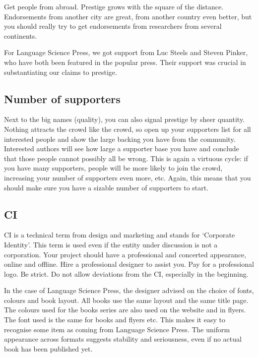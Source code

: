 \documentclass[guidelines,nonflat,modfonts] {langsci/langscibook}
\begin{document}
Get people from abroad. Prestige grows with the square of the distance. Endorsements from another city are great, from another country even better, but you should really try to get endorsements from researchers from several continents. 

For Language Science Press, we got support from Luc Steels and Steven Pinker, who have both been featured in the popular press. Their support was crucial in substantiating our claims to prestige. 

\subsection{Number of supporters}
Next to the big names (quality), you can also signal prestige by sheer quantity. Nothing attracts the crowd like the crowd, so open up your supporters list for all interested people and show the large backing you have from the community. Interested authors will see how large a supporter base you have and conclude that those people cannot possibly all be wrong. This is again a virtuous cycle: if you have many supporters, people will be more likely to join the crowd, increasing your number of supporters even more, etc. Again, this means that you should make sure you have a sizable number of supporters to start. 


 
\subsection{CI}
CI is a technical term from design and marketing and stands for `Corporate Identity'. This term is used even if the entity under discussion is not a corporation. Your project should have a professional and concerted appearance, online and offline. Hire a professional designer to assist you. Pay for a professional logo. Be strict. Do not allow deviations from the CI, especially in the beginning.

In the case of Language Science Press, the designer advised on the choice of fonts, colours and book layout. All books use the same layout and the same title page. The colours used for the books series are also used on the website and in flyers. The font used is the same for books and flyers etc. This makes it easy to recognise some item as coming from Language Science Press. The uniform appearance across formats suggests stability and seriousness, even if no actual book has been published yet. 
\end{document}
